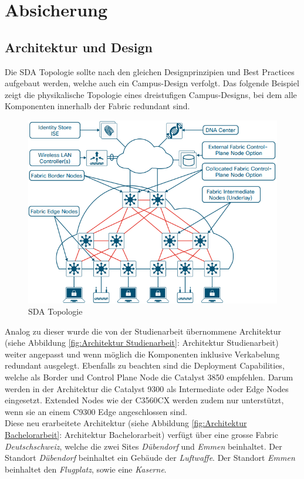 \section{Absicherung}

\subsection{Architektur und Design}
Die SDA Topologie sollte nach den gleichen Designprinzipien und Best Practices aufgebaut werden, welche auch ein Campus-Design verfolgt. Das folgende Beispiel zeigt die physikalische Topologie eines dreistufigen Campus-Designs, bei dem alle Komponenten innerhalb der Fabric redundant sind.

\begin{figure}[H]
	\centering
	\includegraphics[width=0.8\linewidth]{img/Absicherung/SDA-Architektur}
	\caption{SDA Topologie \cite{sda-designguide-sept2018} }
	\label{fig:SDA Topologie}
\end{figure}

Analog zu dieser wurde die von der Studienarbeit übernommene Architektur (siehe Abbildung \ref{fig:Architektur Studienarbeit}: Architektur Studienarbeit) weiter angepasst und wenn möglich die Komponenten inklusive Verkabelung redundant ausgelegt. Ebenfalls zu beachten sind die Deployment Capabilities, welche als Border und Control Plane Node die Catalyst 3850 empfehlen. Darum werden in der Architektur die Catalyst 9300 als Intermediate oder Edge Nodes eingesetzt. Extended Nodes wie der C3560CX werden zudem nur unterstützt, wenn sie an einem C9300 Edge angeschlossen sind. \\
Diese neu erarbeitete Architektur (siehe Abbildung \ref{fig:Architektur Bachelorarbeit}: Architektur Bachelorarbeit) verfügt über eine grosse Fabric \textit{Deutschschweiz}, welche die zwei Sites \textit{Dübendorf} und \textit{Emmen} beinhaltet. Der Standort \textit{Dübendorf} beinhaltet ein Gebäude der \textit{Luftwaffe}. Der Standort \textit{Emmen} beinhaltet den \textit{Flugplatz}, sowie eine \textit{Kaserne}.


